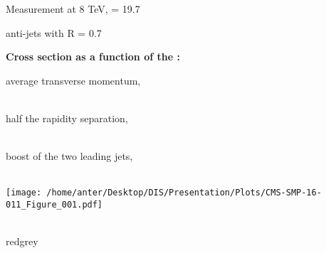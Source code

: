 \begin{frame}
\begin{minipage}[thbp]{0.55\textwidth}
\vspace{-1mm}
\begin{itemize}
\item {\footnotesize Measurement at 8 TeV, \lumi = 19.7 
\vspace{2.0mm} 
\item anti-\kt jets with R = 0.7
\vspace{2.0mm}
\item {\bf Cross section as a function of the :} \\} 
\begin{itemize}
\tri
\item {\footnotesize average transverse momentum, \\ \vspace{1mm} ~~~~ 
\vspace{3.mm}
\item half the rapidity separation, \\ \vspace{1mm} ~~~~
\vspace{3.mm} 
\item boost of the two leading jets, \\ \vspace{1mm} ~~~~ \\}
\tri
\end{itemize}
\ball
\end{itemize}
\end{minipage}
\hspace{-4mm}
\begin{minipage}[thbp]{0.3\textwidth}
\hspace*{-5mm}\texttt{[image: /home/anter/Desktop/DIS/Presentation/Plots/CMS-SMP-16-011\_Figure\_001.pdf]}\\\\
\hspace*{28mm}\begin{beamercolorbox}[wd=23mm,ht=1mm,center,shadow=true, rounded=true]{redgrey}
{}
{\scalebox {0.61} {}}
\end{beamercolorbox}
\end{minipage}
\end{frame}

